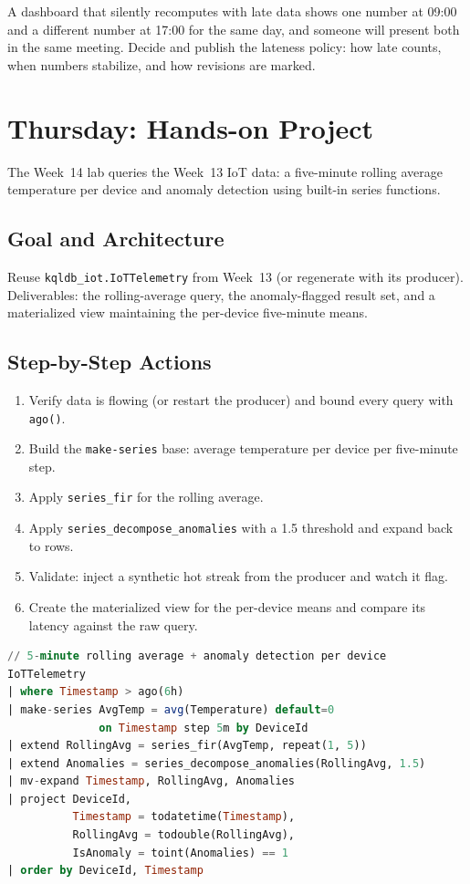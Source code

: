 \begin{pitfall}
A dashboard that silently recomputes with late data shows one number at 09:00 and a different number at 17:00 for the same day, and someone will present both in the same meeting. Decide and publish the lateness policy: how late counts, when numbers stabilize, and how revisions are marked.
\end{pitfall}

\section{Thursday: Hands-on Project}
The Week~14 lab queries the Week~13 IoT data: a five-minute rolling average temperature per device and anomaly detection using built-in series functions.

\subsection{Goal and Architecture}
Reuse \texttt{kqldb\_iot.IoTTelemetry} from Week~13 (or regenerate with its producer). Deliverables: the rolling-average query, the anomaly-flagged result set, and a materialized view maintaining the per-device five-minute means.

\subsection{Step-by-Step Actions}
\begin{enumerate}
    \item Verify data is flowing (or restart the producer) and bound every query with \texttt{ago()}.
    \item Build the \texttt{make-series} base: average temperature per device per five-minute step.
    \item Apply \texttt{series\_fir} for the rolling average.
    \item Apply \texttt{series\_decompose\_anomalies} with a 1.5 threshold and expand back to rows.
    \item Validate: inject a synthetic hot streak from the producer and watch it flag.
    \item Create the materialized view for the per-device means and compare its latency against the raw query.
\end{enumerate}

\begin{lstlisting}[language=SQL,caption={Week 14 lab: rolling average and anomaly detection per device.},label={lst:chapter14-lab}]
// 5-minute rolling average + anomaly detection per device
IoTTelemetry
| where Timestamp > ago(6h)
| make-series AvgTemp = avg(Temperature) default=0
              on Timestamp step 5m by DeviceId
| extend RollingAvg = series_fir(AvgTemp, repeat(1, 5))
| extend Anomalies = series_decompose_anomalies(RollingAvg, 1.5)
| mv-expand Timestamp, RollingAvg, Anomalies
| project DeviceId,
          Timestamp = todatetime(Timestamp),
          RollingAvg = todouble(RollingAvg),
          IsAnomaly = toint(Anomalies) == 1
| order by DeviceId, Timestamp
\end{lstlisting}

